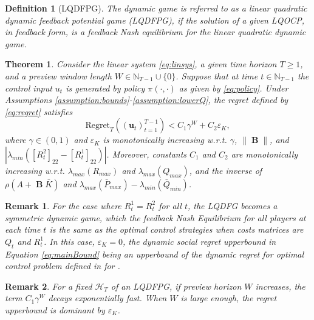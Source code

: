 \documentclass[letterpaper, 10 pt, conference]{ieeeconf}  %
\DeclareMathOperator{\contB}{\mathbf{B}}
\newtheorem{definition}{Definition}
\newtheorem{remark}{Remark}
\newtheorem{theorem}{Theorem}
\begin{document}
\begin{definition}[LQDFPG]\label{def:LQDFPG}
    The dynamic game is referred to as a linear quadratic dynamic feedback potential game (LQDFPG), if the solution of a given LQOCP, in feedback form, is a feedback Nash equilibrium for the linear quadratic dynamic game. 
\end{definition}
\begin{theorem}\label{thm:main}
    Consider the linear system \eqref{eq:linsys}, a given time horizon $T \geq 1$, and a preview window length $W\in \mathbb{N}_{T-1} \cup \{0\}$. Suppose that at time $t \in \mathbb{N}_{T-1}$ the control input $u_t$ is generated by policy $\pi(\cdot,\cdot)$ as given by \eqref{eq:policy}. Under Assumptions \ref{assumption:bounds}-\ref{assumption:lowerQ}, the regret defined by \eqref{eq:regret} satisfies
    \begin{equation}\label{eq:mainBound}
        \text{Regret}_{T}((\mathbf{u}_{t})_{t=1}^{T-1})< C_{1}\gamma^{W} + C_{2}\varepsilon_{K},
    \end{equation}
    where $\gamma \in (0,1)$ and $\varepsilon_{K}$ is monotonically increasing w.r.t. $\gamma$, $\|\contB\|$, and $|\lambda_{min}([R_{t}^{2}]_{22}-[R_{t}^{1}]_{22})|$. Moreover, constants $C_{1}$ and $C_{2}$ are monotonically increasing w.r.t. $\lambda_{max}(R_{max})$ and $\lambda_{max}(Q_{max})$, and the inverse of $\rho(A+\contB\bar{K})$ and $\lambda_{max}(\bar{P}_{max})-\lambda_{min}(\bar{Q}_{min})$. 
    
\end{theorem}
\begin{remark}
    For the case where $R_{t}^{1} = R_{t}^{2}$ for all $t$, the LQDFG becomes a symmetric dynamic game, which the feedback Nash Equilibrium for all players at each time $t$ is the same as the optimal control strategies when costs matrices are $Q_{t}$ and $R_{t}^{1}$. In this case, $\varepsilon_{K}=0$, the \emph{dynamic social regret} upperbound in Equation \eqref{eq:mainBound} being an upperbound of the \emph{dynamic regret} for optimal control problem defined in \cite[Equation (5)]{chen_regret_2023} for \cite[Problem 1a]{chen_regret_2023}. 
\end{remark}
\begin{remark}
    For a fixed $\mathcal{H}_{T}$ of an LQDFPG, if preview horizon $W$ increases, the term $C_{1}\gamma^{W}$ decays exponentially fast. When $W$ is large enough, the \emph{regret} upperbound is dominant by $\varepsilon_{K}$.
\end{remark}
\end{document}
